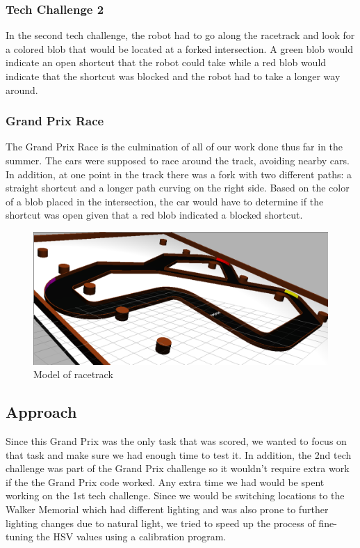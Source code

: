 \documentclass[journal, a4paper]{IEEEtran}
\begin{document}
\subsubsection{Tech Challenge 2}
In the second tech challenge, the robot had to go along the racetrack and look for a colored blob that would be located at a forked intersection. A green blob would indicate an open shortcut that the robot could take while a red blob would indicate that the shortcut was blocked and the robot had to take a longer way around. \\ 
\subsubsection{Grand Prix Race}
The Grand Prix Race is the culmination of all of our work done thus far in the summer. The cars were supposed to race around the track, avoiding nearby cars. In addition, at one point in the track there was a fork with two different paths: a straight shortcut and a longer path curving on the right side. Based on the color of a blob placed in the intersection, the car would have to determine if the shortcut was open given that a red blob indicated a blocked shortcut. 
\begin{figure}[H]
\includegraphics[scale=.20]{gazebo_track.png}
\caption{Model of racetrack \cite{gazebo_pic}} 
\end{figure}
\subsection{Approach}
Since this Grand Prix was the only task that was scored, we wanted to focus on that task and make sure we had enough time to test it. In addition, the 2nd tech challenge was part of the Grand Prix challenge so it wouldn't require extra work if the the Grand Prix code worked. Any extra time we had would be spent working on the 1st tech challenge. Since we would be switching locations to the Walker Memorial which had different lighting and was also prone to further lighting changes due to natural light, we tried to speed up the process of fine-tuning the HSV values using a calibration program.
\end{document}
